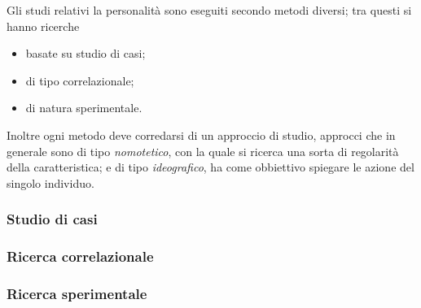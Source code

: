 \documentclass{subfiles}
\begin{document}
Gli studi relativi la personalità sono eseguiti secondo metodi diversi; tra questi si hanno ricerche
\begin{itemize}
    \item basate su studio di casi;
    \item di tipo correlazionale;
    \item di natura sperimentale.
\end{itemize}
Inoltre ogni metodo deve corredarsi di un approccio di studio,
approcci che in generale sono di tipo \emph{nomotetico}, con la quale si ricerca una sorta di regolarità della caratteristica;
e di tipo \emph{ideografico}, ha come obbiettivo spiegare le azione del singolo individuo.

\subsubsection{Studio di casi}


\subsubsection{Ricerca correlazionale}


\subsubsection{Ricerca sperimentale}

\end{document}
